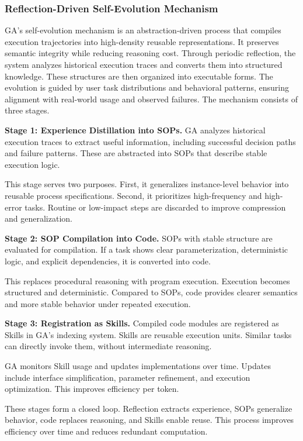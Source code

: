\subsubsection{Reflection-Driven Self-Evolution Mechanism}
\label{sec:self-evolution}

GA’s self-evolution mechanism is an abstraction-driven process that compiles execution trajectories into high-density reusable representations. It preserves semantic integrity while reducing reasoning cost. Through periodic reflection, the system analyzes historical execution traces and converts them into structured knowledge. These structures are then organized into executable forms. The evolution is guided by user task distributions and behavioral patterns, ensuring alignment with real-world usage and observed failures. The mechanism consists of three stages.

\textbf{Stage 1: Experience Distillation into SOPs.} GA analyzes historical execution traces to extract useful information, including successful decision paths and failure patterns. These are abstracted into SOPs that describe stable execution logic.

This stage serves two purposes. First, it generalizes instance-level behavior into reusable process specifications. Second, it prioritizes high-frequency and high-error tasks. Routine or low-impact steps are discarded to improve compression and generalization.

\textbf{Stage 2: SOP Compilation into Code.} SOPs with stable structure are evaluated for compilation. If a task shows clear parameterization, deterministic logic, and explicit dependencies, it is converted into code.

This replaces procedural reasoning with program execution. Execution becomes structured and deterministic. Compared to SOPs, code provides clearer semantics and more stable behavior under repeated execution.

\textbf{Stage 3: Registration as Skills.} Compiled code modules are registered as Skills in GA’s indexing system. Skills are reusable execution units. Similar tasks can directly invoke them, without intermediate reasoning.

GA monitors Skill usage and updates implementations over time. Updates include interface simplification, parameter refinement, and execution optimization. This improves efficiency per token.

These stages form a closed loop. Reflection extracts experience, SOPs generalize behavior, code replaces reasoning, and Skills enable reuse. This process improves efficiency over time and reduces redundant computation. 

